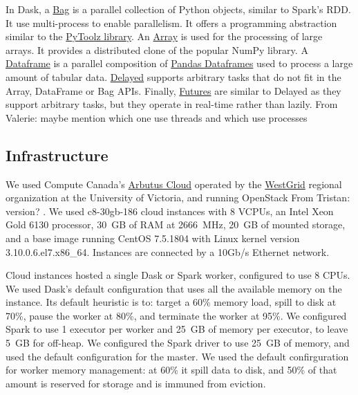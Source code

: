 \documentclass[conference]{IEEEtran}
\newcommand{\TG}[1]{\color{cyan}From Tristan: #1 \color{black}}
\newcommand{\VHS}[1]{\color{green}From Valerie: #1 \color{black}}
\begin{document}
In Dask, a \href{https://docs.dask.org/en/latest/bag.html}{Bag} is a parallel
collection of Python objects, similar to Spark's RDD. It use multi-process to enable
parallelism. It offers a programming abstraction similar to the
\href{https://toolz.readthedocs.io/en/latest/}{PyToolz library}. An
\href{https://docs.dask.org/en/latest/array.html}{Array} is used for the processing
of large arrays. It provides a distributed clone of the popular NumPy library. A
\href{https://docs.dask.org/en/latest/dataframe.html}{Dataframe} is a parallel
composition of
\href{http://pandas.pydata.org/pandas-docs/stable/reference/api/pandas.DataFrame.html}{Pandas
Dataframes} used to process a large amount of tabular data.
\href{https://docs.dask.org/en/latest/delayed.html}{Delayed} supports arbitrary tasks
that do not fit in the Array, DataFrame or Bag APIs. Finally,
\href{https://docs.dask.org/en/latest/futures.html}{Futures} are similar to Delayed
as they support arbitrary tasks, but they operate in real-time rather than lazily.
\VHS{maybe mention which one use threads and which use processes}

\subsection{Infrastructure}

 We used Compute Canada's
 \href{https://docs.computecanada.ca/wiki/Cloud_resources}{Arbutus Cloud}
 operated by the \href{https://www.westgrid.ca}{WestGrid} regional
 organization at the University of Victoria, and running OpenStack
 \TG{version?}. We used c8-30gb-186 cloud instances with 8 VCPUs, an Intel
 Xeon Gold 6130 processor, 30~GB of RAM at 2666~MHz, 20~GB of mounted
 storage, and a base image running CentOS 7.5.1804 with  Linux kernel
 version
 3.10.0.6.el7.x86\_64. Instances are connected by a 10Gb/s Ethernet network. 
 
 Cloud instances hosted a single Dask or Spark worker, configured to use 8 CPUs. We
 used Dask's default configuration that uses all the available memory on the
 instance. Its default heuristic is to: target a 60\% memory load, spill to disk at
 70\%, pause the worker at 80\%, and terminate the worker at 95\%. We configured
 Spark to use 1 executor per worker and 25~GB of memory per executor, to leave 5~GB
 for off-heap. We configured the Spark driver to use 25~GB of memory, and used the
 default configuration for the master. We used the default confirguration for worker
 memory management: at 60\% it spill data to disk, and 50\% of that amount is
 reserved for storage and is immuned from eviction.
 
\end{document}
